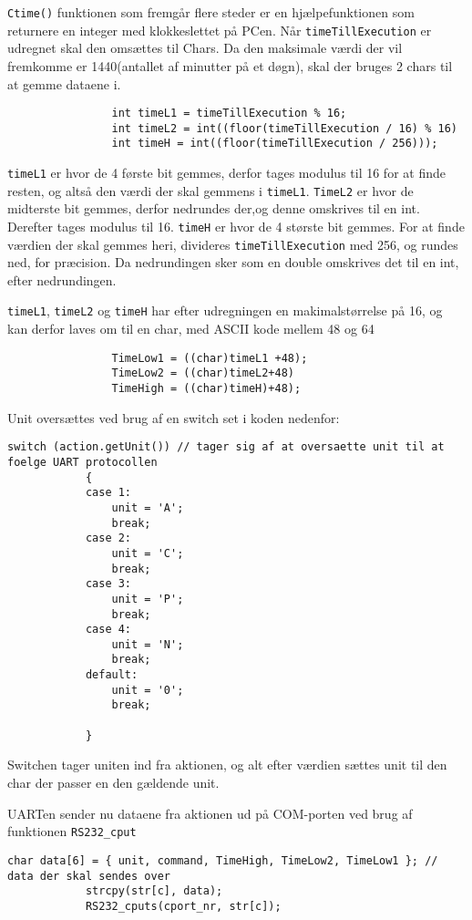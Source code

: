 \texttt{Ctime()} funktionen som fremgår flere steder er en hjælpefunktionen som returnere en integer med klokkeslettet på PCen.
Når \texttt{timeTillExecution} er udregnet skal den omsættes til Chars. Da den maksimale værdi der vil fremkomme er 1440(antallet af minutter på et døgn), skal der bruges 2 chars til at gemme dataene i.
\begin{lstlisting} 
				int timeL1 = timeTillExecution % 16; 
				int timeL2 = int((floor(timeTillExecution / 16) % 16)
				int timeH = int((floor(timeTillExecution / 256)));
\end{lstlisting} 
\texttt{timeL1} er hvor de 4 første bit gemmes, derfor tages modulus til 16 for at finde resten, og altså den værdi der skal gemmens i \texttt{timeL1}.
\texttt{TimeL2} er hvor de midterste bit gemmes, derfor nedrundes der,og denne omskrives til en int. Derefter tages modulus til 16.
\texttt{timeH} er hvor de 4 største bit gemmes. For at finde værdien der skal gemmes heri, divideres \texttt{timeTillExecution} med 256, og rundes ned, for præcision. Da nedrundingen sker som en double omskrives det til en int, efter nedrundingen.

\texttt{timeL1}, \texttt{timeL2} og \texttt{timeH} har efter udregningen en makimalstørrelse på 16, og kan derfor laves om til en char, med ASCII kode mellem 48 og 64
\begin{lstlisting} 
				TimeLow1 = ((char)timeL1 +48);
				TimeLow2 = ((char)timeL2+48)
				TimeHigh = ((char)timeH)+48);
\end{lstlisting} 

Unit oversættes ved brug af en switch set i koden nedenfor:
\begin{lstlisting} 
switch (action.getUnit()) // tager sig af at oversaette unit til at foelge UART protocollen
			{
			case 1:
				unit = 'A';
				break;
			case 2:
				unit = 'C';
				break;
			case 3:
				unit = 'P';
				break;
			case 4:
				unit = 'N';
				break;
			default: 
				unit = '0';
				break;

			}
\end{lstlisting} 
Switchen tager uniten ind fra aktionen, og alt efter værdien sættes unit til den char der passer en den gældende unit.

UARTen sender nu dataene fra aktionen ud på COM-porten ved brug af funktionen \texttt{RS232\_cput}

\begin{lstlisting}
char data[6] = { unit, command, TimeHigh, TimeLow2, TimeLow1 }; // data der skal sendes over
			strcpy(str[c], data);
			RS232_cputs(cport_nr, str[c]);
\end{lstlisting}

